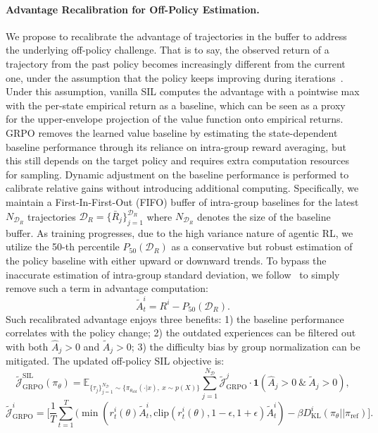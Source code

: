\documentclass[]{youtu} %
\begin{document}
\paragraph{Advantage Recalibration for Off-Policy Estimation.}
{We propose to recalibrate the advantage of trajectories in the buffer to address the underlying off-policy challenge.}
That is to say, the observed return of a trajectory from the past policy becomes increasingly different from the current one, under the assumption that the policy keeps improving during iterations~\cite{ferret2020self,luo2021self}. 
Under this assumption, vanilla SIL computes the advantage with a pointwise max with the per-state empirical return as a baseline, which can be seen as a proxy for the upper-envelope projection of the value function onto empirical returns.
GRPO removes the learned value baseline by estimating the state-dependent baseline performance through its reliance on intra-group reward averaging, but this still depends on the target policy and requires extra computation resources for sampling.
{Dynamic adjustment on the baseline performance is performed to calibrate relative gains without introducing additional computing.}
Specifically,
we maintain a First-In-First-Out (FIFO) buffer of intra-group baselines for the latest $N_{\mathcal{D}_{R}}$ trajectories $\mathcal{D}_R=\{\bar{R}_{j}\}_{j=1}^{\mathcal{D}_{R}}$ where $N_{\mathcal{D}_{R}}$ denotes the size of the baseline buffer.
As training progresses, due to the high variance nature of agentic RL, we utilize the 50-th percentile $P_{50}(\mathcal{D}_R)$ as a conservative but robust estimation of the policy baseline with either upward or downward trends.
To bypass the inaccurate estimation of intra-group standard deviation, we follow~\cite{liu2025understanding} to simply remove such a term in advantage computation:
\begin{equation}\label{eq:recalibrateadv}
    \tilde{A}^{i}_{t}=R^{i}-P_{50}(\mathcal{D}_R).
\end{equation}
Such recalibrated advantage enjoys three benefits:
1) the baseline performance correlates with the policy change;
2) the outdated experiences 
can be filtered out with both $\hat{A}_{j}>0$ and $\tilde{A}_{j}>0$;
3) the difficulty bias by group normalization
can be mitigated.
The updated off-policy 
SIL objective is:
\begin{equation}\label{eq:silvanilla}
    \tilde{\mathcal{J}}_{\text{GRPO}}^{\text{SIL}}(\pi_\theta)=
     \mathbb{E}_{\{\tau_{j}\}_{j=1}^{N_{\mathcal{D}}}\sim \{\pi_{\theta_{\text{old}}}(\cdot|x),\ x\sim p(X)\}}\sum_{j=1}^{N_{\mathcal{D}}}\tilde{\mathcal{J}}_{\text{GRPO}}^{j}\cdot\mathbf{1}(\hat{A}_{j}>0\ \&\ \tilde{A}_{j}>0),
\end{equation}
\begin{equation}\label{eq:silvanilladetail}
    \tilde{\mathcal{J}}_{\text{GRPO}}^{i}=\Biggr[
    \frac{1}{T}\sum_{t=1}^{T}(\min(r^{i}_{t}(\theta)\tilde{A}^{i}_{t}, \text{clip}(r^{i}_{t}(\theta), 1-\epsilon, 1+\epsilon)\tilde{A}^{i}_{t})-
    \beta D_{\text{KL}}^{i}(\pi_{\theta}||\pi_{\text{ref}})\Biggr].
\end{equation}
\end{document}
